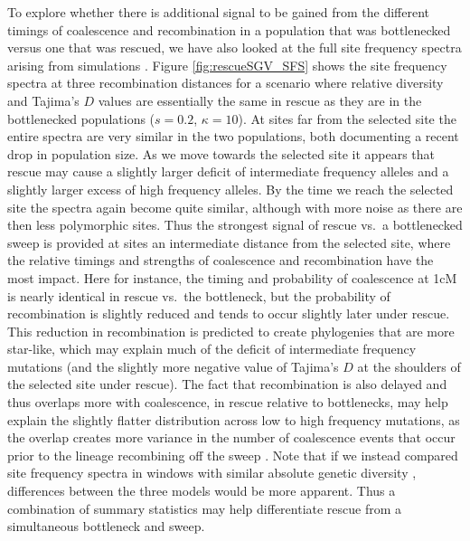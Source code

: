 \documentclass[]{article}
\begin{document}
To explore whether there is additional signal to be gained from the different timings of coalescence and recombination in a population that was bottlenecked versus one that was rescued, we have also looked at the full site frequency spectra arising from simulations \citep[of which pairwise diversity and Tajima's $D$ are summaries;][p.\ 116]{wakeley2009coalescent}.
Figure \ref{fig:rescueSGV_SFS} shows the site frequency spectra at three recombination distances for a scenario where relative diversity and Tajima's $D$ values are essentially the same in rescue as they are in the bottlenecked populations ($s=0.2$, $\kappa=10$).
At sites far from the selected site the entire spectra are very similar in the two populations, both documenting a recent drop in population size.
As we move towards the selected site it appears that rescue may cause a slightly larger deficit of intermediate frequency alleles and a slightly larger excess of high frequency alleles.
By the time we reach the selected site the spectra again become quite similar, although with more noise as there are then less polymorphic sites.
Thus the strongest signal of rescue vs.\ a bottlenecked sweep is provided at sites an intermediate distance from the selected site, where the relative timings and strengths of coalescence and recombination have the most impact.
Here for instance, the timing and probability of coalescence at 1cM is nearly identical in rescue vs.\ the bottleneck, but the probability of recombination is slightly reduced and tends to occur slightly later under rescue. 
This reduction in recombination is predicted to create phylogenies that are more star-like, which may explain much of the deficit of intermediate frequency mutations (and the slightly more negative value of Tajima's $D$ at the shoulders of the selected site under rescue).
The fact that recombination is also delayed and thus overlaps more with coalescence, in rescue relative to bottlenecks, may help explain the slightly flatter distribution across low to high frequency mutations, as the overlap creates more variance in the number of coalescence events that occur prior to the lineage recombining off the sweep \citep[similar to the effect of recurrent mutation;][]{pennings2006soft}.
Note that if we instead compared site frequency spectra in windows with similar absolute genetic diversity \citep[as in][]{kim2010signatures}, differences between the three models would be more apparent.
Thus a combination of summary statistics may help differentiate rescue from a simultaneous bottleneck and sweep.
\end{document}
